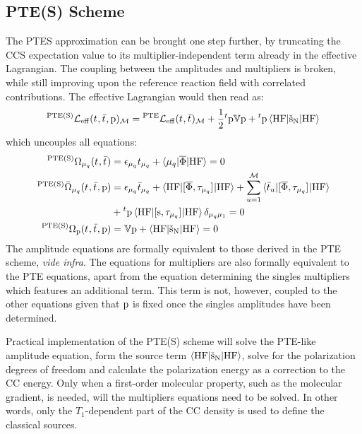 \subsection*{PTE(S) Scheme}

The \acrshort{PTES} approximation can be brought one step further, by
truncating the \acrshort{CCS} expectation value to its multiplier-independent
term already in the effective Lagrangian.
The coupling between the amplitudes and multipliers is broken, while
still improving upon the reference reaction field with correlated
contributions.\autocite{Caricato2011-tx}
The effective Lagrangian would then read as:
\begin{equation}\label{eq:pte-s-cc}
    {}^{\mathrm{PTE(S)}}\mathcal{L}_\mathrm{eff}(t_{}, \bar{t}_{}, \mathrm{p})_\mathcal{M} =
  {}^\mathrm{PTE}\mathcal{L}_\mathrm{eff}(t_{}, \bar{t}_{})_\mathcal{M}
  + \frac{1}{2}{}^t\mathrm{p}\mathbb{V}\mathrm{p} + {}^t\mathrm{p}\braket{\mathrm{HF} | \check{\mathrm{s}}_{\mathrm{N}} | \mathrm{HF}}
\end{equation}
which uncouples all equations:
\begin{subequations}
  \begin{align}
  {}^{\mathrm{PTE(S)}}\Omega_{\mu_q}(t_{}, \bar{t}_{})  &=
   \epsilon_{\mu_q}t_{\mu_q} + \braket{\mu_q | \overline{\Phi} | \mathrm{HF}}
   = 0 \\
   {}^{\mathrm{PTE(S)}}\bar{\Omega}_{\mu_q}(t_{}, \bar{t}_{}, \mathrm{p}) &=
    \epsilon_{\mu_q}\bar{t}_{\mu_q} +
    \braket{\mathrm{HF} | [ \overline{\Phi}, \tau_{\mu_q} ]^{} | \mathrm{HF}} +
    \sum_{u=1}^{\mathcal{M}}\braket{\bar{t}_{u} |
    [ \overline{\Phi}, \tau_{\mu_q} ]^{} | \mathrm{HF}}
    \nonumber \\
    &+
    {}^t\mathrm{p}\braket{\mathrm{HF} | [ \mathrm{s}, \tau_{\mu_q} ]^{} | \mathrm{HF}}\delta_{\mu_q\mu_1}
    = 0 \\
    {}^{\mathrm{PTE(S)}}\Omega_{\mathrm{p}}(t_{}, \bar{t}_{}, \mathrm{p})
    &=
    \mathbb{V}\mathrm{p} + \braket{\mathrm{HF} | \check{\mathrm{s}}_{\mathrm{N}} | \mathrm{HF}} = 0
    \label{eq:pte-s-polarization}
  \end{align}
\end{subequations}
The amplitude equations are formally equivalent to those derived in the
\acrshort{PTE} scheme, \emph{vide infra}. The equations for multipliers are also formally
equivalent to the \acrshort{PTE} equations, apart from the equation
determining the singles multipliers which features an additional term.
This term is not, however, coupled to the other equations given that
$\mathrm{p}$ is fixed once the singles amplitudes have been determined.

Practical implementation of the \acrshort{PTE(S)} scheme will solve the
\acrshort{PTE}-like amplitude equation, form the source term
$\braket{\mathrm{HF} | \check{\mathrm{s}}_\mathrm{N} | \mathrm{HF}}$, solve for
the polarization degrees of freedom and calculate the polarization
energy as a correction to the \acrshort{CC} energy.
Only when a first-order molecular property, such as the molecular
gradient, is needed, will the multipliers equations need to be solved.
In other words, only the $T_1$-dependent part of the \acrshort{CC} density is
used to define the classical sources.

